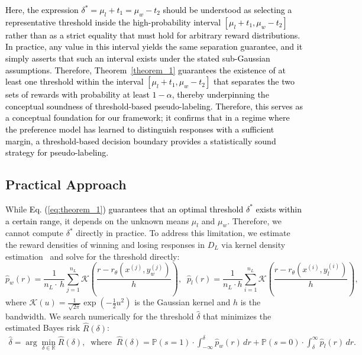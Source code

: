 \documentclass{article} %
\newcommand\fix[1]{\textcolor{black}{#1}}
\newcommand\rebuttal[1]{\textcolor{black}{#1}}
\begin{document}
\rebuttal{Here, the expression $\delta^* = \mu_l + t_1 = \mu_w - t_2$ should be understood as selecting a representative threshold inside the high-probability interval $[\mu_l + t_1, \mu_w - t_2]$ rather than as a strict equality that must hold for arbitrary reward distributions. In practice, any value in this interval yields the same separation guarantee, and it simply asserts that such an interval exists under the stated sub-Gaussian assumptions.}
\rebuttal{Therefore, Theorem~\ref{theorem_1} guarantees the existence of at least one threshold within the interval $[\mu_l + t_1, \mu_w - t_2]$ that separates the two sets of rewards with probability at least $1-\alpha$, thereby underpinning the conceptual soundness of threshold-based pseudo-labeling. Therefore, this serves as a conceptual foundation for our framework; it confirms that in a regime where the preference model has learned to distinguish responses with a sufficient margin, a threshold-based decision boundary provides a statistically sound strategy for pseudo-labeling.}


\subsection{Practical Approach}
\label{sec:KDE}
While \fix{Eq. (\ref{eq:theorem_1}) guarantees that an optimal threshold $\delta^*$ exists within a certain range,} it depends on the unknown means $\mu_l$ and $\mu_w$. Therefore, we cannot compute $\delta^*$ directly in practice. To address this limitation, we estimate the reward densities of winning and losing responses in $D_L$ via kernel density estimation~\citep{parzen1962estimation, silverman2018density} and solve for the threshold directly:
\begin{equation}
\hat{p}_w(r) = \frac{1}{n_L \cdot\,h} \sum_{j=1}^{n_L} \mathcal{K}\left(\frac{r - r_\theta(x^{(j)}, y_w^{(j)})}{h}\right), \; \;
\hat{p}_l(r) = \frac{1}{n_L \cdot h} \sum_{i=1}^{n_L} \mathcal{K}\left(\frac{r - r_\theta(x^{(i)}, y_l^{(i)})}{h}\right),
\end{equation}
where $\mathcal{K}(u) = \frac{1}{\sqrt{2\pi}} \exp(-\frac{1}{2}u^2)$ is the Gaussian kernel and $h$ is the bandwidth. We search numerically for the threshold $\hat{\delta}$ that minimizes the estimated Bayes risk $\hat{R}(\delta)$:
\begin{align}
\hat{\delta} = \arg\min_{\delta\in\mathbb{R}}  \hat{R}(\delta), \;\; \text{where} \;\; \hat{R}(\delta) = \mathbb{P}(s=1) \cdot \int_{-\infty}^{\delta} \hat{p}_w(r)\,dr 
+ \mathbb{P}(s=0) \cdot \int_{\delta}^{\infty} \hat{p}_l(r)\,dr.
\end{align}
\end{document}
